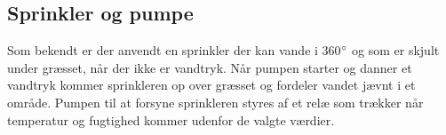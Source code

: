 \subsection{Sprinkler og pumpe}
Som bekendt er der anvendt en sprinkler der kan vande i 360$^{\circ}$ og som er skjult under græsset, når der ikke er vandtryk. Når pumpen starter og danner et vandtryk kommer sprinkleren op over græsset og fordeler vandet jævnt i et område. 
Pumpen til at forsyne sprinkleren styres af et relæ som trækker når temperatur og fugtighed kommer udenfor de valgte værdier.

